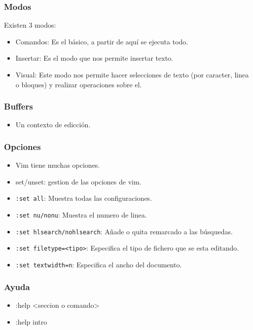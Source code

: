\documentclass[10pt]{beamer}
\begin{document}

  \begin{frame}
    \frametitle{Modos}
  
    Existen 3 modos:
    \begin{itemize}
      \item Comandos: Es el básico, a partir de aquí se ejecuta todo.
      \item Insertar: Es el modo que nos permite insertar texto.
      \item Visual: Este modo nos permite hacer selecciones de texto (por caracter, linea o bloques) y realizar operaciones sobre el.
    \end{itemize}
  \end{frame}

  \begin{frame}
    \frametitle{Buffers}
  
    \begin{itemize}
      \item Un contexto de edicción.
    \end{itemize}
  \end{frame}

  \begin{frame}[containsverbatim]
    \frametitle{Opciones}
  
    \begin{itemize}
      \item Vim tiene muchas opciones.
      \item set/unset: gestion de las opciones de vim.
      \item \verb+:set all+: Muestra todas las configuraciones.
      \item \verb+:set nu/nonu+: Muestra el numero de linea.
      \item \verb+:set hlsearch/nohlsearch+: Añade o quita remarcado a las búsquedas.
      \item \verb+:set filetype=<tipo>+: Especifica el tipo de fichero que se esta editando.
      \item \verb+:set textwidth=n+: Especifica el ancho del documento.
    \end{itemize}
  \end{frame}

  \begin{frame}
    \frametitle{Ayuda}
  
    \begin{itemize}
      \item :help <seccion o comando>
      \item :help intro
    \end{itemize}
  \end{frame}
  
\end{document}
